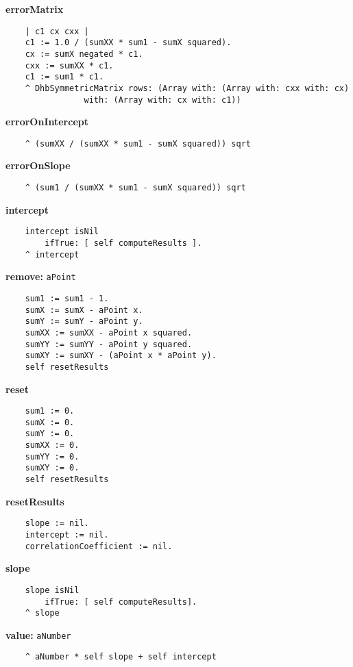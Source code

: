 {\bf errorMatrix}
\begin{verbatim}
    | c1 cx cxx |
    c1 := 1.0 / (sumXX * sum1 - sumX squared).
    cx := sumX negated * c1.
    cxx := sumXX * c1.
    c1 := sum1 * c1.
    ^ DhbSymmetricMatrix rows: (Array with: (Array with: cxx with: cx)
                with: (Array with: cx with: c1))
\end{verbatim}
{\bf errorOnIntercept}
\begin{verbatim}
    ^ (sumXX / (sumXX * sum1 - sumX squared)) sqrt
\end{verbatim}
{\bf errorOnSlope}
\begin{verbatim}
    ^ (sum1 / (sumXX * sum1 - sumX squared)) sqrt
\end{verbatim}
{\bf intercept}
\begin{verbatim}
    intercept isNil
        ifTrue: [ self computeResults ].
    ^ intercept
\end{verbatim}
{\bf remove:} {\tt aPoint}
\begin{verbatim}
    sum1 := sum1 - 1.
    sumX := sumX - aPoint x.
    sumY := sumY - aPoint y.
    sumXX := sumXX - aPoint x squared.
    sumYY := sumYY - aPoint y squared.
    sumXY := sumXY - (aPoint x * aPoint y).
    self resetResults
\end{verbatim}
{\bf reset}
\begin{verbatim}
    sum1 := 0.
    sumX := 0.
    sumY := 0.
    sumXX := 0.
    sumYY := 0.
    sumXY := 0.
    self resetResults
\end{verbatim}
{\bf resetResults}
\begin{verbatim}
    slope := nil.
    intercept := nil.
    correlationCoefficient := nil.
\end{verbatim}
{\bf slope}
\begin{verbatim}
    slope isNil
        ifTrue: [ self computeResults].
    ^ slope
\end{verbatim}
{\bf value:} {\tt aNumber}
\begin{verbatim}
    ^ aNumber * self slope + self intercept
\end{verbatim}

